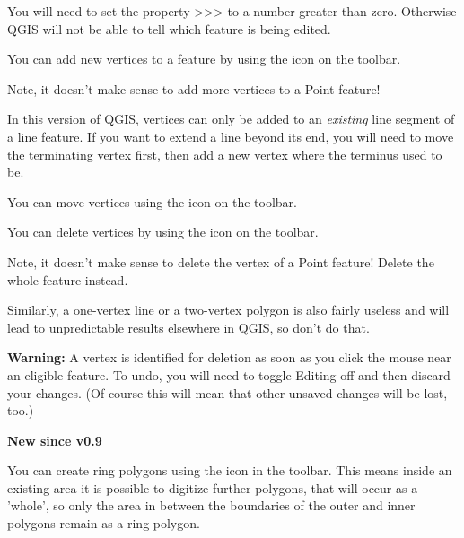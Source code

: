 You will need to set the property
>>>
to a number greater than zero.  Otherwise QGIS will not be able to tell which feature is being edited.



You can add new vertices to a feature by using the
 icon
on the toolbar.

Note, it doesn't make sense to add more vertices to a Point feature!

In this version of QGIS, vertices can only be added to an \textit{existing} line
segment of a line feature.  If you want to extend a line beyond its end,
you will need to move the terminating vertex first, then add a new vertex where
the terminus used to be.


You can move vertices using the  icon
on the toolbar.


You can delete vertices by using the  icon
on the toolbar.

Note, it doesn't make sense to delete the vertex of a Point feature!
Delete the whole feature instead.

Similarly, a one-vertex line or a two-vertex polygon is also
fairly useless and will lead to unpredictable results elsewhere
in QGIS, so don't do that.

\textbf{Warning:} A vertex is identified for deletion as
soon as you click the mouse near an eligible
feature.  To undo, you will need to toggle
Editing off and then discard your changes.
(Of course this will mean that other unsaved changes will be lost, too.)

\textbf{New since v0.9}

You can create ring polygons using the 
icon in the toolbar. This means inside an existing area it is
possible to digitize further polygons, that will occur as a 'whole', so only 
the area in between the boundaries of the outer and inner polygons remain as 
a ring polygon. 

